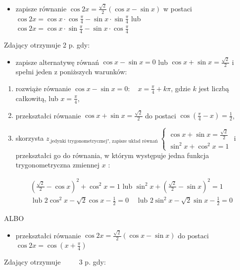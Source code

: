 \documentclass[10pt]{article}
\begin{document}
\begin{itemize}
  \item zapisze równanie $\cos 2 x=\frac{\sqrt{2}}{2}(\cos x-\sin x)$ w postaci $\cos 2 x=\cos x \cdot \cos \frac{\pi}{4}-\sin x \cdot \sin \frac{\pi}{4}$ lub $\cos 2 x=\cos x \cdot \sin \frac{\pi}{4}-\sin x \cdot \cos \frac{\pi}{4}$
\end{itemize}

Zdający otrzymuje 2 p. gdy:

\begin{itemize}
  \item zapisze alternatywę równań $\cos x-\sin x=0$ lub $\cos x+\sin x=\frac{\sqrt{2}}{2}$ i spełni jeden z poniższych warunków:
\end{itemize}

\begin{enumerate}
  \item rozwiąże równanie $\cos x-\sin x=0: \quad x=\frac{\pi}{4}+k \pi$, gdzie $k$ jest liczbą całkowitą, lub $x=\frac{\pi}{4}$,
  \item przekształci równanie $\cos x+\sin x=\frac{\sqrt{2}}{2}$ do postaci $\cos \left(\frac{\pi}{4}-x\right)=\frac{1}{2}$,
  \item skorzysta $z_{\text {,jedynki trygonometrycznej", zapisze układ równań }}\left\{\begin{array}{c}\cos x+\sin x=\frac{\sqrt{2}}{2} \\ \sin ^{2} x+\cos ^{2} x=1\end{array}\right.$ i przekształci go do równania, w którym występuje jedna funkcja trygonometryczna zmiennej $x$ :
\end{enumerate}

$$
\begin{aligned}
& \left(\frac{\sqrt{2}}{2}-\cos x\right)^{2}+\cos ^{2} x=1 \text { lub } \sin ^{2} x+\left(\frac{\sqrt{2}}{2}-\sin x\right)^{2}=1 \\
& \text { lub } 2 \cos ^{2} x-\sqrt{2} \cos x-\frac{1}{2}=0 \quad \text { lub } 2 \sin ^{2} x-\sqrt{2} \sin x-\frac{1}{2}=0
\end{aligned}
$$

ALBO

\begin{itemize}
  \item przekształci równanie $\cos 2 x=\frac{\sqrt{2}}{2}(\cos x-\sin x)$ do postaci $\cos 2 x=\cos \left(x+\frac{\pi}{4}\right)$
\end{itemize}

Zdający otrzymuje $\qquad$ 3 p. gdy:
\end{document}
